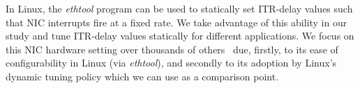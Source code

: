In Linux, the \textit{ethtool} program can be used
to statically set ITR-delay values
such that NIC interrupts fire at a fixed rate.
We take advantage of this ability in our study and tune ITR-delay values statically for different applications.
We focus on this NIC hardware setting
over thousands of others~\cite{82599}
due, firstly, to its ease of configurability in Linux (via \textit{ethtool}),
and secondly to its adoption by Linux's dynamic tuning policy
which we can use as a comparison point.










